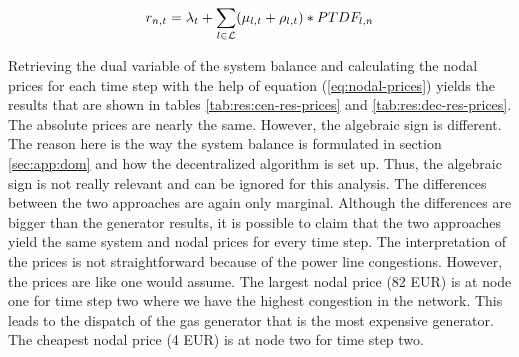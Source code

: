 \begin{equation}
	r_{n,t} = \lambda_t + \sum_{l \in \mathcal{L}} (\mu_{l,t} + \rho_{l,t}) * PTDF_{l,n}
	\label{eq:nodal-prices}
\end{equation}

Retrieving the dual variable of the system balance and calculating the nodal prices for each time step with the help of equation (\ref{eq:nodal-prices}) yields the results that are shown in tables \ref{tab:res:cen-res-prices} and \ref{tab:res:dec-res-prices}. The absolute prices are nearly the same. However, the algebraic sign is different. The reason here is the way the system balance is formulated in section \ref{sec:app:dom} and how the decentralized algorithm is set up. Thus, the algebraic sign is not really relevant and can be ignored for this analysis. The differences between the two approaches are again only marginal. Although the differences are bigger than the generator results, it is possible to claim that the two approaches yield the same system and nodal prices for every time step. The interpretation of the prices is not straightforward because of the power line congestions. However, the prices are like one would assume. The largest nodal price (82 EUR) is at node one for time step two where we have the highest congestion in the network. This leads to the dispatch of the gas generator that is the most expensive generator. The cheapest nodal price (4 EUR) is at node two for time step two.

